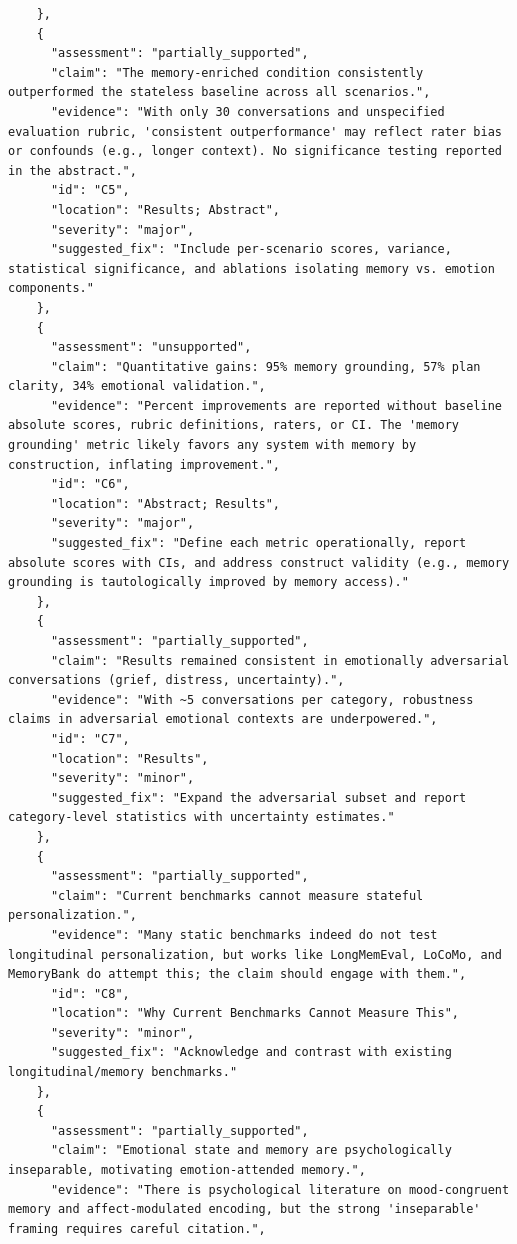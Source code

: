\documentclass[11pt]{article}
\begin{document}
\begin{verbatim}
    },
    {
      "assessment": "partially_supported",
      "claim": "The memory-enriched condition consistently outperformed the stateless baseline across all scenarios.",
      "evidence": "With only 30 conversations and unspecified evaluation rubric, 'consistent outperformance' may reflect rater bias or confounds (e.g., longer context). No significance testing reported in the abstract.",
      "id": "C5",
      "location": "Results; Abstract",
      "severity": "major",
      "suggested_fix": "Include per-scenario scores, variance, statistical significance, and ablations isolating memory vs. emotion components."
    },
    {
      "assessment": "unsupported",
      "claim": "Quantitative gains: 95% memory grounding, 57% plan clarity, 34% emotional validation.",
      "evidence": "Percent improvements are reported without baseline absolute scores, rubric definitions, raters, or CI. The 'memory grounding' metric likely favors any system with memory by construction, inflating improvement.",
      "id": "C6",
      "location": "Abstract; Results",
      "severity": "major",
      "suggested_fix": "Define each metric operationally, report absolute scores with CIs, and address construct validity (e.g., memory grounding is tautologically improved by memory access)."
    },
    {
      "assessment": "partially_supported",
      "claim": "Results remained consistent in emotionally adversarial conversations (grief, distress, uncertainty).",
      "evidence": "With ~5 conversations per category, robustness claims in adversarial emotional contexts are underpowered.",
      "id": "C7",
      "location": "Results",
      "severity": "minor",
      "suggested_fix": "Expand the adversarial subset and report category-level statistics with uncertainty estimates."
    },
    {
      "assessment": "partially_supported",
      "claim": "Current benchmarks cannot measure stateful personalization.",
      "evidence": "Many static benchmarks indeed do not test longitudinal personalization, but works like LongMemEval, LoCoMo, and MemoryBank do attempt this; the claim should engage with them.",
      "id": "C8",
      "location": "Why Current Benchmarks Cannot Measure This",
      "severity": "minor",
      "suggested_fix": "Acknowledge and contrast with existing longitudinal/memory benchmarks."
    },
    {
      "assessment": "partially_supported",
      "claim": "Emotional state and memory are psychologically inseparable, motivating emotion-attended memory.",
      "evidence": "There is psychological literature on mood-congruent memory and affect-modulated encoding, but the strong 'inseparable' framing requires careful citation.",

\end{verbatim}
\end{document}
